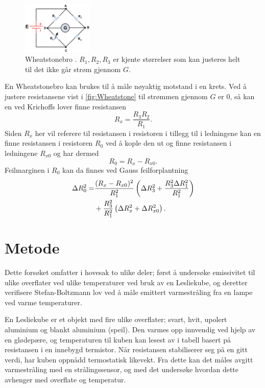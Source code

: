\begin{figure}
  \centering
  \includegraphics[width=0.30\textwidth]{wheat.jpg}
  \caption{Wheatstonebro \cite{wheatstone}. $R_{1}, R_{2}, R_{3}$ er kjente størrelser som kan justeres helt til det ikke går strøm gjennom $G$.}
  \label{fig:Wheatstone}
\end{figure}

En Wheatstonebro kan brukes til å måle nøyaktig motstand i en krets. Ved å justere resistansene vist i \autoref{fig:Wheatstone} til strømmen gjennom $G$ er 0, så kan en ved Krichoffs lover finne resistansen
\begin{equation}
  \label{eq:Wheatstone}
  R_{x} = \frac{R_{3} R_{2}}{R_{1}}.
\end{equation}
Siden $R_{x}$ her vil referere til resistansen i resistoren i tillegg til i ledningene kan en finne resistansen i resistoren $R_{0}$ ved å kople den ut og finne resistansen i ledningene $R_{x0}$ og har dermed
\begin{equation}
  \label{eq:WheatstoneReal}
  R_{0} = R_{x} - R_{x0}.
\end{equation}
Feilmarginen i $R_{0}$ kan da finnes ved Gauss feilforplantning
\begin{align}
  \label{eq:ErrorBridge}
  \Delta R_{0}^{2} =& \frac{(R_{x} - R_{x0})^{2}}{R_{1}^{2}} \left( \Delta R_{3}^{2} + \frac{R_{3}^{2} \Delta R_{1}^{2}}{R_{1}^{2}} \right) \notag \\
  &+ \frac{R_{3}^{2}}{R_{1}^{2}} \left( \Delta R_{x}^{2} + \Delta R_{x0}^{2} \right).
\end{align}


\section{Metode}
Dette forsøket omfatter i hovesak to ulike deler; først å undersøke emissivitet til ulike overflater ved ulike temperaturer ved bruk av en Lesliekube, og deretter verifisere Stefan-Boltzmann lov ved å måle emittert varmestråling fra en lampe ved varme temperaturer.

En Lesliekube er et objekt med fire ulike overflater; svart, hvit, upolert aluminium og blankt aluminium (speil). Den varmes opp innvendig ved hjelp av en glødepære, og temperaturen til kuben kan lesest av i tabell basert på resistansen i en innebygd termistor. Når resistansen stabiliserer seg på en gitt verdi, har kuben oppnådd termostatisk likevekt. Fra dette kan det måles avgitt varmestråling med en strålingssensor, og med det undersøke hvordan dette avhenger med overflate og temperatur.

